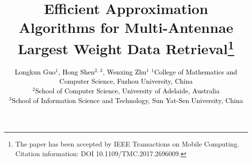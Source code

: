 \documentclass[11pt,english,onecolumn,draftcls]{IEEEtran}
\theoremstyle{plain}
\theoremstyle{plain}
\theoremstyle{plain}
\theoremstyle{plain}
\begin{document}
\title{Efficient Approximation Algorithms for Multi-Antennae Largest Weight
Data Retrieval\thanks{The paper has been accepted by IEEE Transactions on Mobile Computing.
Citation information: DOI 10.1109/TMC.2017.2696009. }}


\author{\textcolor{black}{Longkun Guo$^{1}$, Hong Shen$^{2,\,3}$, Wenxing
Zhu$^{1}$}\linebreak{}
\textcolor{black}{{} $^{1}$College of Mathematics and Computer Science,
Fuzhou University, China}\\
\textcolor{black}{{} $^{2}$School of Computer Science, University of
Adelaide, Australia }\\
\textcolor{black}{$^{3}$School of Information Science and Technology,
Sun Yat-Sen University, China}\\
}
\maketitle
\end{document}
